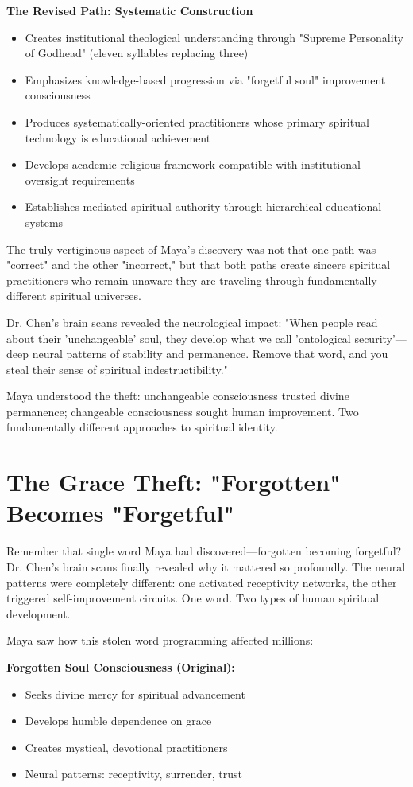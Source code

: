 \documentclass[11pt,twoside]{book}
\begin{document}
\textbf{\textbf{The Revised Path: Systematic Construction}}  
\begin{itemize}
\item Creates institutional theological understanding through "Supreme Personality of Godhead" (eleven syllables replacing three)
\item Emphasizes knowledge-based progression via "forgetful soul" improvement consciousness
\item Produces systematically-oriented practitioners whose primary spiritual technology is educational achievement
\item Develops academic religious framework compatible with institutional oversight requirements
\item Establishes mediated spiritual authority through hierarchical educational systems
\end{itemize}

The truly vertiginous aspect of Maya's discovery was not that one path was "correct" and the other "incorrect," but that both paths create sincere spiritual practitioners who remain unaware they are traveling through fundamentally different spiritual universes.

Dr. Chen's brain scans revealed the neurological impact: "When people read about their 'unchangeable' soul, they develop what we call 'ontological security'—deep neural patterns of stability and permanence. Remove that word, and you steal their sense of spiritual indestructibility."

Maya understood the theft: unchangeable consciousness trusted divine permanence; changeable consciousness sought human improvement. Two fundamentally different approaches to spiritual identity.
\section*{The Grace Theft: "Forgotten" Becomes "Forgetful"}
\label{sec:orgd16d450}

Remember that single word Maya had discovered—forgotten becoming forgetful? Dr. Chen's brain scans finally revealed why it mattered so profoundly. The neural patterns were completely different: one activated receptivity networks, the other triggered self-improvement circuits. One word. Two types of human spiritual development.

Maya saw how this stolen word programming affected millions:

\textbf{\textbf{Forgotten Soul Consciousness (Original):}}
\begin{itemize}
\item Seeks divine mercy for spiritual advancement
\item Develops humble dependence on grace
\item Creates mystical, devotional practitioners
\item Neural patterns: receptivity, surrender, trust
\end{itemize}
\end{document}
